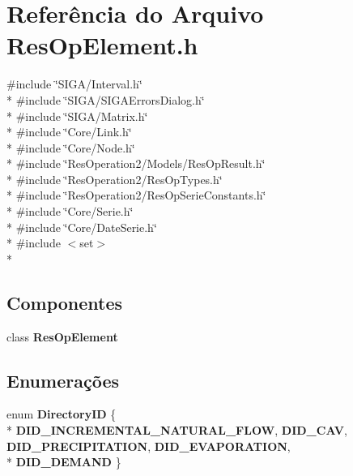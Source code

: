 \section{Referência do Arquivo Res\+Op\+Element.\+h}
\label{_res_op_element_8h}
{\ttfamily \#include \char`\"{}S\+I\+G\+A/\+Interval.\+h\char`\"{}}\\*
{\ttfamily \#include \char`\"{}S\+I\+G\+A/\+S\+I\+G\+A\+Errors\+Dialog.\+h\char`\"{}}\\*
{\ttfamily \#include \char`\"{}S\+I\+G\+A/\+Matrix.\+h\char`\"{}}\\*
{\ttfamily \#include \char`\"{}Core/\+Link.\+h\char`\"{}}\\*
{\ttfamily \#include \char`\"{}Core/\+Node.\+h\char`\"{}}\\*
{\ttfamily \#include \char`\"{}Res\+Operation2/\+Models/\+Res\+Op\+Result.\+h\char`\"{}}\\*
{\ttfamily \#include \char`\"{}Res\+Operation2/\+Res\+Op\+Types.\+h\char`\"{}}\\*
{\ttfamily \#include \char`\"{}Res\+Operation2/\+Res\+Op\+Serie\+Constants.\+h\char`\"{}}\\*
{\ttfamily \#include \char`\"{}Core/\+Serie.\+h\char`\"{}}\\*
{\ttfamily \#include \char`\"{}Core/\+Date\+Serie.\+h\char`\"{}}\\*
{\ttfamily \#include $<$set$>$}\\*
\subsection*{Componentes}
\begin{DoxyCompactItemize}
\item 
class {\bf Res\+Op\+Element}
\end{DoxyCompactItemize}
\subsection*{Enumerações}
\begin{DoxyCompactItemize}
\item 
enum {\bf Directory\+ID} \{ \\*
{\bf D\+I\+D\+\_\+\+I\+N\+C\+R\+E\+M\+E\+N\+T\+A\+L\+\_\+\+N\+A\+T\+U\+R\+A\+L\+\_\+\+F\+L\+OW}, 
{\bf D\+I\+D\+\_\+\+C\+AV}, 
{\bf D\+I\+D\+\_\+\+P\+R\+E\+C\+I\+P\+I\+T\+A\+T\+I\+ON}, 
{\bf D\+I\+D\+\_\+\+E\+V\+A\+P\+O\+R\+A\+T\+I\+ON}, 
\\*
{\bf D\+I\+D\+\_\+\+D\+E\+M\+A\+ND}
 \}
\end{DoxyCompactItemize}
